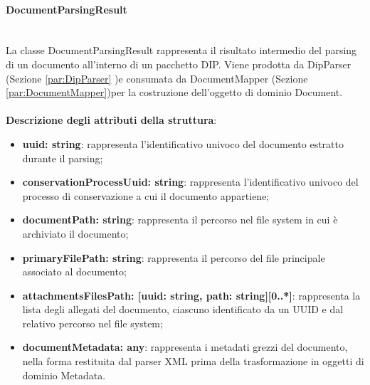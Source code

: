 \documentclass[a4paper,12pt]{article}
\begin{document}
                \paragraph{DocumentParsingResult}\label{par:DocumentParsingResult}\mbox{}\\
                La classe DocumentParsingResult rappresenta il risultato intermedio del parsing di un documento all'interno di un pacchetto DIP. Viene prodotta da DipParser (Sezione \ref{par:DipParser} )e consumata da DocumentMapper (Sezione \ref{par:DocumentMapper})per la costruzione dell'oggetto di dominio Document.\\
                \\
                \textbf{Descrizione degli attributi della struttura}:
                \begin{itemize}
                    \item \textbf{uuid: string}: rappresenta l'identificativo univoco del documento estratto durante il parsing;
                    \item \textbf{conservationProcessUuid: string}: rappresenta l'identificativo univoco del processo di conservazione a cui il documento appartiene;
                    \item \textbf{documentPath: string}: rappresenta il percorso nel file system in cui è archiviato il documento;
                    \item \textbf{primaryFilePath: string}: rappresenta il percorso del file principale associato al documento;
                    \item \textbf{attachmentsFilesPath: [uuid: string, path: string][0..*]}: rappresenta la lista degli allegati del documento, ciascuno identificato da un UUID e dal relativo percorso nel file system;
                    \item \textbf{documentMetadata: any}: rappresenta i metadati grezzi del documento, nella forma restituita dal parser XML prima della trasformazione in oggetti di dominio Metadata.
                \end{itemize}
\end{document}
